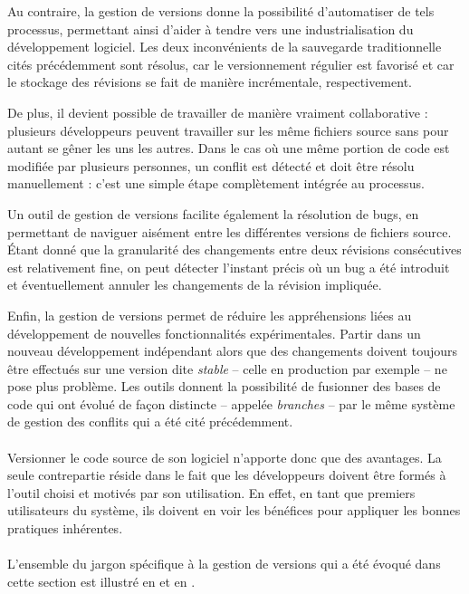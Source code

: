 Au contraire, la gestion de versions donne la possibilité d'automatiser de tels processus, permettant ainsi d'aider à tendre vers une industrialisation du développement logiciel.
Les deux inconvénients de la sauvegarde traditionnelle cités précédemment sont résolus, car le versionnement régulier est favorisé et car le stockage des révisions se fait de manière incrémentale, respectivement.

De plus, il devient possible de travailler de manière vraiment collaborative : plusieurs développeurs peuvent travailler sur les même fichiers source sans pour autant se gêner les uns les autres.
Dans le cas où une même portion de code est modifiée par plusieurs personnes, un conflit est détecté et doit être résolu manuellement : c'est une simple étape complètement intégrée au processus.

Un outil de gestion de versions facilite également la résolution de bugs, en permettant de naviguer aisément entre les différentes versions de fichiers source.
Étant donné que la granularité des changements entre deux révisions consécutives est relativement fine, on peut détecter l'instant précis où un bug a été introduit et éventuellement annuler les changements de la révision impliquée.

Enfin, la gestion de versions permet de réduire les appréhensions liées au développement de nouvelles fonctionnalités expérimentales.
Partir dans un nouveau développement indépendant alors que des changements doivent toujours être effectués sur une version dite \emph{stable} -- celle en production par exemple -- ne pose plus problème.
Les outils donnent la possibilité de fusionner des bases de code qui ont évolué de façon distincte -- appelée \emph{branches} -- par le même système de gestion des conflits qui a été cité précédemment.

\paragraph{}
Versionner le code source de son logiciel n'apporte donc que des avantages.
La seule contrepartie réside dans le fait que les développeurs doivent être formés à l'outil choisi et motivés par son utilisation.
En effet, en tant que premiers utilisateurs du système, ils doivent en voir les bénéfices pour appliquer les bonnes pratiques inhérentes.

\paragraph{}
L'ensemble du jargon spécifique à la gestion de versions qui a été évoqué dans cette section est illustré en  et en .


